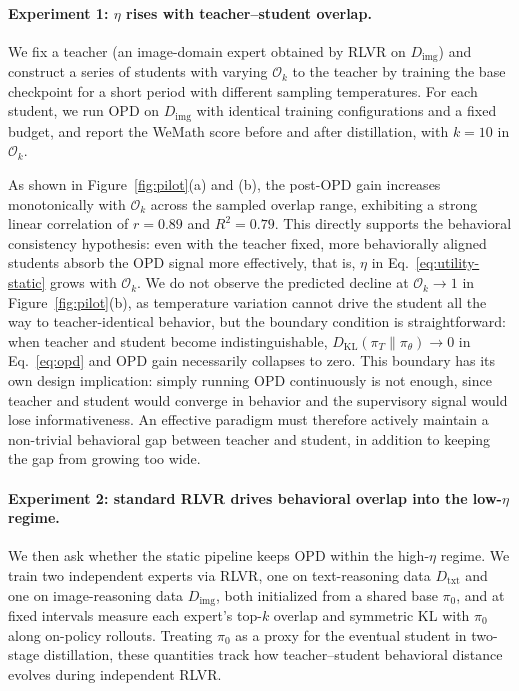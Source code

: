 \paragraph{Experiment 1: $\eta$ rises with teacher--student overlap.} 
We fix a teacher (an image-domain expert obtained by RLVR on $D_{\text{img}}$) and construct a series of students with varying $\mathcal{O}_k$ to the teacher by training the base checkpoint for a short period with different sampling temperatures. For each student, we run OPD on $D_{\text{img}}$ with identical training configurations and a fixed budget, and report the WeMath score before and after distillation, with $k = 10$ in $\mathcal{O}_k$.

As shown in Figure~\ref{fig:pilot}(a) and (b), the post-OPD gain increases monotonically with $\mathcal{O}_k$ across the sampled overlap range, exhibiting a strong linear correlation of $r = 0.89$ and $R^2 = 0.79$. This directly supports the behavioral consistency hypothesis: even with the teacher fixed, more behaviorally aligned students absorb the OPD signal more effectively, that is, $\eta$ in Eq.~\eqref{eq:utility-static} grows with $\mathcal{O}_k$. We do not observe the predicted decline at $\mathcal{O}_k \to 1$ in Figure~\ref{fig:pilot}(b), as temperature variation cannot drive the student all the way to teacher-identical behavior, but the boundary condition is straightforward: when teacher and student become indistinguishable, $D_{\mathrm{KL}}(\pi_T \| \pi_\theta) \to 0$ in Eq.~\eqref{eq:opd} and OPD gain necessarily collapses to zero. This boundary has its own design implication: simply running OPD continuously is not enough, since teacher and student would converge in behavior and the supervisory signal would lose informativeness. An effective paradigm must therefore actively maintain a non-trivial behavioral gap between teacher and student, in addition to keeping the gap from growing too wide.


\paragraph{Experiment 2: standard RLVR drives behavioral overlap into the low-$\eta$ regime.}
We then ask whether the static pipeline keeps OPD within the high-$\eta$ regime. We train two independent experts via RLVR, one on text-reasoning data $D_{\text{txt}}$ and one on image-reasoning data $D_{\text{img}}$, both initialized from a shared base $\pi_0$, and at fixed intervals measure each expert's top-$k$ overlap and symmetric KL with $\pi_0$ along on-policy rollouts. Treating $\pi_0$ as a proxy for the eventual student in two-stage distillation, these quantities track how teacher--student behavioral distance evolves during independent RLVR.



